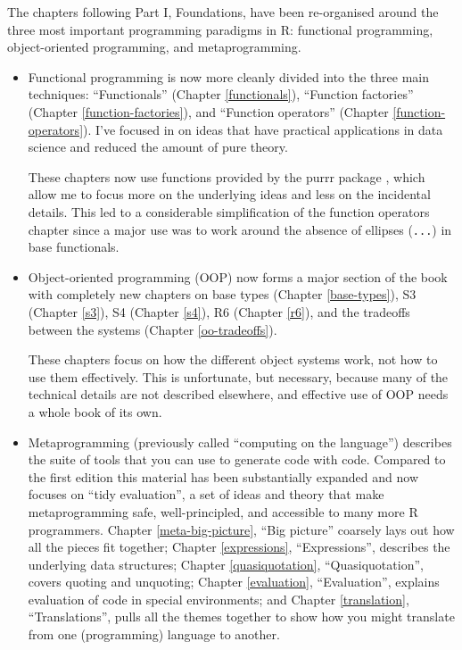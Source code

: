 \documentclass[
]{book}
\begin{document}
The chapters following Part I, Foundations, have been re-organised around the three most important programming paradigms in R: functional programming, object-oriented programming, and metaprogramming.

\begin{itemize}
\item
  Functional programming is now more cleanly divided into the three main
  techniques: ``Functionals'' (Chapter \ref{functionals}), ``Function
  factories'' (Chapter \ref{function-factories}), and ``Function operators''
  (Chapter \ref{function-operators}). I've focused in on ideas that have
  practical applications in data science and reduced the amount of pure theory.

  These chapters now use functions provided by the purrr package \citep{purrr},
  which allow me to focus more on the underlying ideas and less on the
  incidental details. This led to a considerable simplification of the
  function operators chapter since a major use was to work around the absence
  of ellipses (\texttt{...}) in base functionals.
\item
  Object-oriented programming (OOP) now forms a major section of the book with
  completely new chapters on base types (Chapter \ref{base-types}),
  S3 (Chapter \ref{s3}), S4 (Chapter \ref{s4}), R6 (Chapter \ref{r6}),
  and the tradeoffs between the systems (Chapter \ref{oo-tradeoffs}).

  These chapters focus on how the different object systems work,
  not how to use them effectively. This is unfortunate, but necessary, because
  many of the technical details are not described elsewhere, and effective use
  of OOP needs a whole book of its own.
\item
  Metaprogramming (previously called ``computing on the language'') describes the
  suite of tools that you can use to generate code with code. Compared to the
  first edition this material has been substantially expanded and now focuses on
  ``tidy evaluation'', a set of ideas and theory that make metaprogramming
  safe, well-principled, and accessible to many more R programmers.
  Chapter \ref{meta-big-picture}, ``Big picture'' coarsely lays out how all
  the pieces fit together; Chapter \ref{expressions}, ``Expressions'', describes
  the underlying data structures; Chapter \ref{quasiquotation},
  ``Quasiquotation'', covers quoting and unquoting; Chapter \ref{evaluation},
  ``Evaluation'', explains evaluation of code in special environments; and Chapter
  \ref{translation}, ``Translations'', pulls all the themes together to show
  how you might translate from one (programming) language to another.
\end{itemize}
\end{document}
